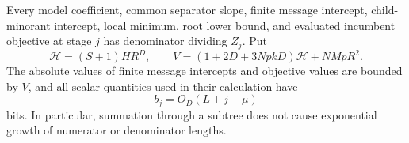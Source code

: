 \begin{lemma}
\label{lem:arithmetic-size}
Every model coefficient, common separator slope, finite message intercept,
child-minorant intercept, local minimum, root lower bound, and evaluated
incumbent objective at stage $j$ has denominator dividing $Z_j$.  Put
\[
 \mathcal H=(S+1)HR^D,
 \qquad
 V=(1+2D+3NpkD)\mathcal H+NMpR^2.
\]
The absolute values of finite message intercepts and objective values are
bounded by $V$, and all scalar quantities used in their calculation have
\begin{equation}
 b_j=O_D(L+j+\mu)
 \label{eq:arithmetic-scalar-bits}
\end{equation}
bits.  In particular, summation through a subtree does not cause exponential
growth of numerator or denominator lengths.
\end{lemma}

